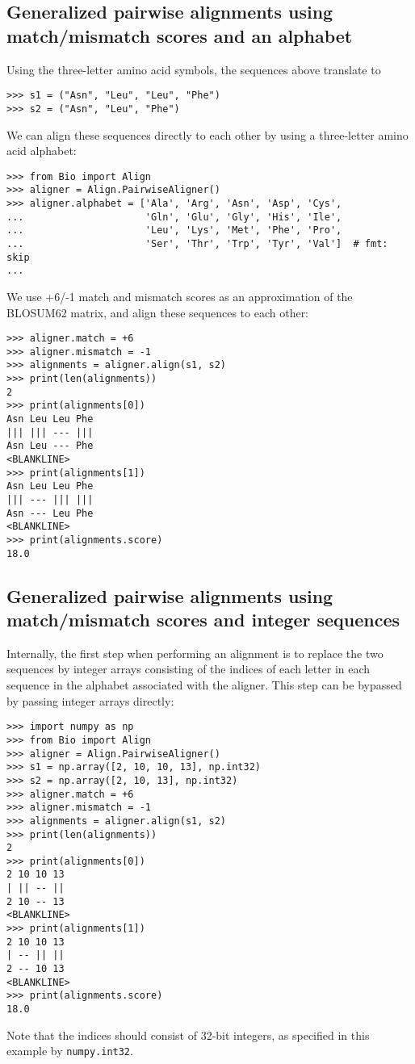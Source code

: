 \subsection{Generalized pairwise alignments using match/mismatch scores and an alphabet}

Using the three-letter amino acid symbols, the sequences above translate to

\begin{verbatim}
>>> s1 = ("Asn", "Leu", "Leu", "Phe")
>>> s2 = ("Asn", "Leu", "Phe")
\end{verbatim}
We can align these sequences directly to each other by using a three-letter amino acid alphabet:

\begin{verbatim}
>>> from Bio import Align
>>> aligner = Align.PairwiseAligner()
>>> aligner.alphabet = ['Ala', 'Arg', 'Asn', 'Asp', 'Cys',
...                     'Gln', 'Glu', 'Gly', 'His', 'Ile',
...                     'Leu', 'Lys', 'Met', 'Phe', 'Pro',
...                     'Ser', 'Thr', 'Trp', 'Tyr', 'Val']  # fmt: skip
...
\end{verbatim}
We use +6/-1 match and mismatch scores as an approximation of the BLOSUM62 matrix, and align these sequences to each other:

\begin{verbatim}
>>> aligner.match = +6
>>> aligner.mismatch = -1
>>> alignments = aligner.align(s1, s2)
>>> print(len(alignments))
2
>>> print(alignments[0])
Asn Leu Leu Phe
||| ||| --- |||
Asn Leu --- Phe
<BLANKLINE>
>>> print(alignments[1])
Asn Leu Leu Phe
||| --- ||| |||
Asn --- Leu Phe
<BLANKLINE>
>>> print(alignments.score)
18.0
\end{verbatim}

\subsection{Generalized pairwise alignments using match/mismatch scores and integer sequences}

Internally, the first step when performing an alignment is to replace the two sequences by integer arrays consisting of the indices of each letter in each sequence in the alphabet associated with the aligner. This step can be bypassed by passing integer arrays directly:

\begin{verbatim}
>>> import numpy as np
>>> from Bio import Align
>>> aligner = Align.PairwiseAligner()
>>> s1 = np.array([2, 10, 10, 13], np.int32)
>>> s2 = np.array([2, 10, 13], np.int32)
>>> aligner.match = +6
>>> aligner.mismatch = -1
>>> alignments = aligner.align(s1, s2)
>>> print(len(alignments))
2
>>> print(alignments[0])
2 10 10 13
| || -- ||
2 10 -- 13
<BLANKLINE>
>>> print(alignments[1])
2 10 10 13
| -- || ||
2 -- 10 13
<BLANKLINE>
>>> print(alignments.score)
18.0
\end{verbatim}
Note that the indices should consist of 32-bit integers, as specified in this example by \verb+numpy.int32+.

